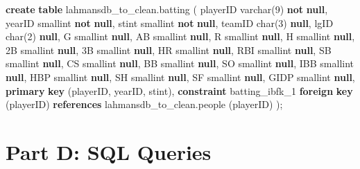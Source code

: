 \documentclass[11pt]{article}
\newenvironment{Shaded}{}{}
\newcommand{\KeywordTok}[1]{\textcolor[rgb]{0.00,0.44,0.13}{\textbf{{#1}}}}
\newcommand{\DataTypeTok}[1]{\textcolor[rgb]{0.56,0.13,0.00}{{#1}}}
\newcommand{\DecValTok}[1]{\textcolor[rgb]{0.25,0.63,0.44}{{#1}}}
\newcommand{\NormalTok}[1]{{#1}}
\begin{document}
    \begin{Shaded}
\begin{Highlighting}[]
\KeywordTok{create} \KeywordTok{table}\NormalTok{ lahmansdb\_to\_clean.batting}
\NormalTok{(}
\NormalTok{    playerID }\DataTypeTok{varchar}\NormalTok{(}\DecValTok{9}\NormalTok{) }\KeywordTok{not} \KeywordTok{null}\NormalTok{,}
\NormalTok{    yearID }\DataTypeTok{smallint} \KeywordTok{not} \KeywordTok{null}\NormalTok{,}
\NormalTok{    stint }\DataTypeTok{smallint} \KeywordTok{not} \KeywordTok{null}\NormalTok{,}
\NormalTok{    teamID }\DataTypeTok{char}\NormalTok{(}\DecValTok{3}\NormalTok{) }\KeywordTok{null}\NormalTok{,}
\NormalTok{    lgID }\DataTypeTok{char}\NormalTok{(}\DecValTok{2}\NormalTok{) }\KeywordTok{null}\NormalTok{,}
\NormalTok{    G }\DataTypeTok{smallint} \KeywordTok{null}\NormalTok{,}
\NormalTok{    AB }\DataTypeTok{smallint} \KeywordTok{null}\NormalTok{,}
\NormalTok{    R }\DataTypeTok{smallint} \KeywordTok{null}\NormalTok{,}
\NormalTok{    H }\DataTypeTok{smallint} \KeywordTok{null}\NormalTok{,}
\NormalTok{    \textasciigrave{}2B\textasciigrave{} }\DataTypeTok{smallint} \KeywordTok{null}\NormalTok{,}
\NormalTok{    \textasciigrave{}3B\textasciigrave{} }\DataTypeTok{smallint} \KeywordTok{null}\NormalTok{,}
\NormalTok{    HR }\DataTypeTok{smallint} \KeywordTok{null}\NormalTok{,}
\NormalTok{    RBI }\DataTypeTok{smallint} \KeywordTok{null}\NormalTok{,}
\NormalTok{    SB }\DataTypeTok{smallint} \KeywordTok{null}\NormalTok{,}
\NormalTok{    CS }\DataTypeTok{smallint} \KeywordTok{null}\NormalTok{,}
\NormalTok{    BB }\DataTypeTok{smallint} \KeywordTok{null}\NormalTok{,}
\NormalTok{    SO }\DataTypeTok{smallint} \KeywordTok{null}\NormalTok{,}
\NormalTok{    IBB }\DataTypeTok{smallint} \KeywordTok{null}\NormalTok{,}
\NormalTok{    HBP }\DataTypeTok{smallint} \KeywordTok{null}\NormalTok{,}
\NormalTok{    SH }\DataTypeTok{smallint} \KeywordTok{null}\NormalTok{,}
\NormalTok{    SF }\DataTypeTok{smallint} \KeywordTok{null}\NormalTok{,}
\NormalTok{    GIDP }\DataTypeTok{smallint} \KeywordTok{null}\NormalTok{,}
    \KeywordTok{primary} \KeywordTok{key}\NormalTok{ (playerID, yearID, stint),}
    \KeywordTok{constraint}\NormalTok{ batting\_ibfk\_1}
        \KeywordTok{foreign} \KeywordTok{key}\NormalTok{ (playerID) }\KeywordTok{references}\NormalTok{ lahmansdb\_to\_clean.people (playerID)}
\NormalTok{);}


\end{Highlighting}
\end{Shaded}

    \hypertarget{part-d-sql-queries}{%
\section{Part D: SQL Queries}\label{part-d-sql-queries}}
\end{document}
